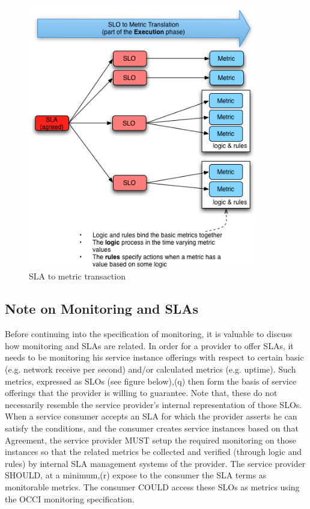 \documentclass[12pt]{article}  %
\begin{document}
\begin{figure}
\centering
\includegraphics[width=10cm]{occi-sla-metric.png}
\caption{\label{slametric} SLA to metric transaction}
\end{figure}


\subsection{Note on Monitoring and SLAs}
Before continuing into the specification of monitoring, it is valuable to discuss how monitoring and SLAs are related. In order for a provider to offer SLAs, it needs to be monitoring his service instance offerings with respect to certain basic (e.g. network receive per second) and/or calculated metrics (e.g. uptime). Such metrics, expressed as SLOs (see figure below),(q) then form the basis of service offerings that the provider is willing to guarantee. Note that, these do not necessarily resemble the service provider’s internal representation of those SLOs. When a service consumer accepts an SLA for which the provider asserts he can satisfy the conditions, and the consumer creates service instances based on that Agreement, the service provider MUST setup the required monitoring on those instances so that the related metrics be collected and verified (through logic and rules) by internal SLA management systems of the provider. The service provider SHOULD, at a minimum,(r) expose to the consumer the SLA terms as monitorable metrics. The consumer COULD access these SLOs as metrics using the OCCI monitoring specification.
\end{document}
